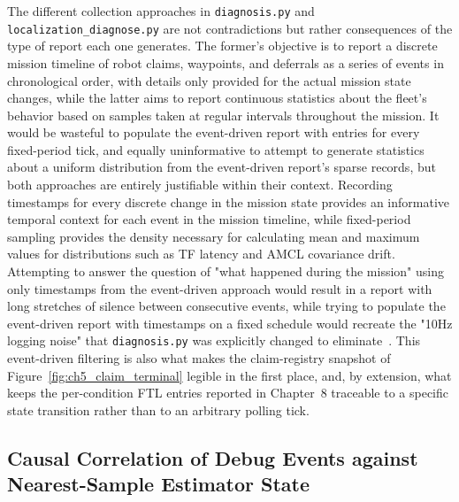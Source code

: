 The different collection approaches in \texttt{diagnosis.py} and \texttt{localization\_diagnose.py} are not contradictions but rather consequences of the type of report each one generates. The former's objective is to report a discrete mission timeline of robot claims, waypoints, and deferrals as a series of events in chronological order, with details only provided for the actual mission state changes, while the latter aims to report continuous statistics about the fleet's behavior based on samples taken at regular intervals throughout the mission. It would be wasteful to populate the event-driven report with entries for every fixed-period tick, and equally uninformative to attempt to generate statistics about a uniform distribution from the event-driven report's sparse records, but both approaches are entirely justifiable within their context. Recording timestamps for every discrete change in the mission state provides an informative temporal context for each event in the mission timeline, while fixed-period sampling provides the density necessary for calculating mean and maximum values for distributions such as TF latency and AMCL covariance drift. Attempting to answer the question of "what happened during the mission" using only timestamps from the event-driven approach would result in a report with long stretches of silence between consecutive events, while trying to populate the event-driven report with timestamps on a fixed schedule would recreate the "10Hz logging noise" that \texttt{diagnosis.py} was explicitly changed to eliminate~\cite{blass2021automatic}. This event-driven filtering is also what makes the claim-registry snapshot of Figure~\ref{fig:ch5_claim_terminal} legible in the first place, and, by extension, what keeps the per-condition FTL entries reported in Chapter~8 traceable to a specific state transition rather than to an arbitrary polling tick.

\subsection{Causal Correlation of Debug Events against Nearest-Sample Estimator State}

